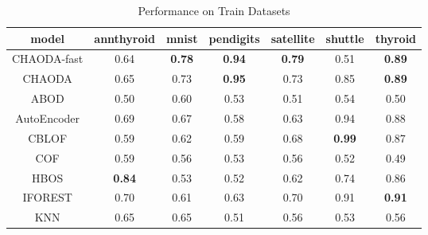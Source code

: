 

\begin{table*}[!t]
\renewcommand{\arraystretch}{1.25}
\caption{Performance on Train Datasets}
\label{table:results:train-performance}
\centering
\begin{tabular}{|c|c|c|c|c|c|c|}
\hline
\textbf{model} & \textbf{annthyroid} & \textbf{mnist} & \textbf{pendigits} & \textbf{satellite} & \textbf{shuttle} & \textbf{thyroid} \\
\hline
        CHAODA-fast &                0.64 &  \textbf{0.78} &      \textbf{0.94} &      \textbf{0.79} &             0.51 &    \textbf{0.89} \\
\hline
        CHAODA &                0.65 &           0.73 &      \textbf{0.95} &               0.73 &             0.85 &    \textbf{0.89} \\
\hline
                ABOD &                0.50 &           0.60 &               0.53 &               0.51 &             0.54 &             0.50 \\
\hline
        AutoEncoder &                0.69 &           0.67 &               0.58 &               0.63 &             0.94 &             0.88 \\
\hline
                CBLOF &                0.59 &           0.62 &               0.59 &               0.68 &    \textbf{0.99} &             0.87 \\
\hline
                COF &                0.59 &           0.56 &               0.53 &               0.56 &             0.52 &             0.49 \\
\hline
                HBOS &       \textbf{0.84} &           0.53 &               0.52 &               0.62 &             0.74 &             0.86 \\
\hline
        IFOREST &                0.70 &           0.61 &               0.63 &               0.70 &             0.91 &    \textbf{0.91} \\
\hline
                KNN &                0.65 &           0.65 &               0.51 &               0.56 &             0.53 &             0.56 \\

\end{tabular}
\end{table*}
